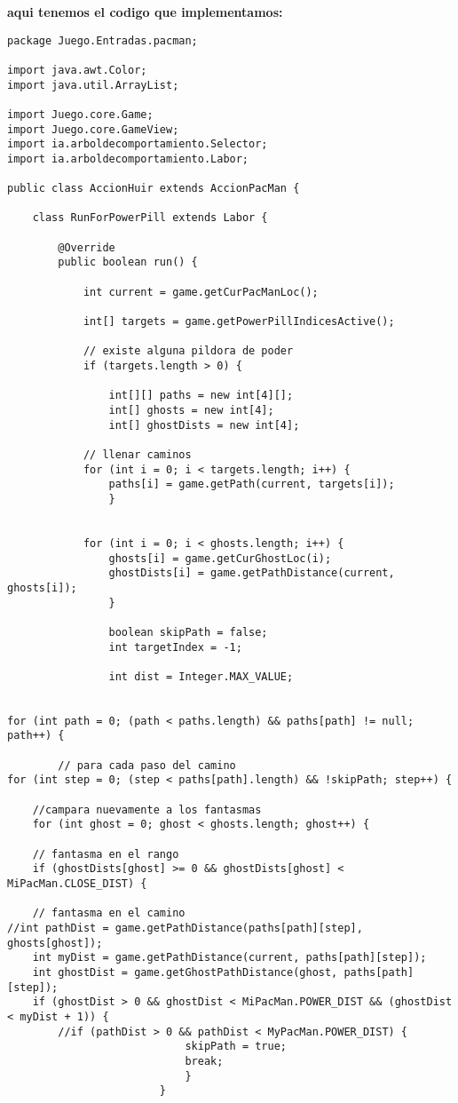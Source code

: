 \documentclass[11pt]{article}
\begin{document}
\textbf{aqui tenemos el codigo que implementamos:}\\
\linebreak
\lstset{language=java, breaklines=true, basicstyle=\footnotesize}
\begin{lstlisting}[frame=single]
package Juego.Entradas.pacman;

import java.awt.Color;
import java.util.ArrayList;

import Juego.core.Game;
import Juego.core.GameView;
import ia.arboldecomportamiento.Selector;
import ia.arboldecomportamiento.Labor;

public class AccionHuir extends AccionPacMan {
	
	class RunForPowerPill extends Labor {

		@Override
		public boolean run() {
			
			int current = game.getCurPacManLoc();
			
			int[] targets = game.getPowerPillIndicesActive();
			
			// existe alguna pildora de poder
			if (targets.length > 0) {
				
				int[][] paths = new int[4][];
				int[] ghosts = new int[4];
				int[] ghostDists = new int[4];
				
			// llenar caminos
			for (int i = 0; i < targets.length; i++) {
				paths[i] = game.getPath(current, targets[i]);
				}
				
				
			for (int i = 0; i < ghosts.length; i++) {
				ghosts[i] = game.getCurGhostLoc(i);
				ghostDists[i] = game.getPathDistance(current, ghosts[i]);
			    }
				
				boolean skipPath = false;
				int targetIndex = -1;
				
				int dist = Integer.MAX_VALUE;
				
				
for (int path = 0; (path < paths.length) && paths[path] != null; path++) {
									
		// para cada paso del camino 
for (int step = 0; (step < paths[path].length) && !skipPath; step++) {
						
	//campara nuevamente a los fantasmas
	for (int ghost = 0; ghost < ghosts.length; ghost++) {
							
	// fantasma en el rango
	if (ghostDists[ghost] >= 0 && ghostDists[ghost] < MiPacMan.CLOSE_DIST) {
								
	// fantasma en el camino
//int pathDist = game.getPathDistance(paths[path][step], ghosts[ghost]);
	int myDist = game.getPathDistance(current, paths[path][step]);
	int ghostDist = game.getGhostPathDistance(ghost, paths[path][step]);
	if (ghostDist > 0 && ghostDist < MiPacMan.POWER_DIST && (ghostDist < myDist + 1)) {
		//if (pathDist > 0 && pathDist < MyPacMan.POWER_DIST) {
							skipPath = true;
							break;
							} 
						}
							

\end{lstlisting}
\end{document}
